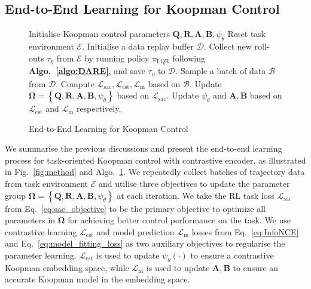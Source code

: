 \documentclass{article}
\begin{document}
\subsection{End-to-End Learning for Koopman Control}
\begin{figure}
    \begin{algorithm}[H]
        \caption{\small End-to-End Learning for Koopman Control}
        \label{algo:main}
        \small
    \begin{algorithmic}[1]
    \STATE Initialise Koopman control parameters $\mathbf{Q}, \mathbf{R}, \mathbf{A}, \mathbf{B}, \psi_{\theta} $
    \STATE Reset task environment $\mathcal{E}$.
    \STATE Initialise a data replay buffer $\mathcal{D}$.
        \STATE Collect new roll-outs $\tau_\eta$ from $\mathcal{E}$ by running policy $\pi_{\text{LQR}}$ following \textbf{Algo.~\ref{algo:DARE}}, and save $\tau_\eta$ to $\mathcal{D}$.
        \STATE Sample a batch of data  $\mathcal{B}$ from  $\mathcal{D}$.
        \STATE Compute $\mathcal{L}_{\text{sac}}, \mathcal{L}_{\text{cst}}, \mathcal{L}_{\text{m}}$ based on $\mathcal{B}$.
        \STATE Update $\boldsymbol{\Omega}=\left\{\mathbf{Q}, \mathbf{R}, \mathbf{A}, \mathbf{B}, \psi_{\theta} \right\}$ based on $\mathcal{L}_{\text{sac}}$.
        \STATE Update $\psi_{\theta}$ and $\mathbf{A}, \mathbf{B}$ based on $\mathcal{L}_{\text{cst}}$ and $\mathcal{L}_{\text{m}}$ respectively.
    \ENDFOR
    \end{algorithmic}
\end{algorithm}
\end{figure}
We summarise the previous discussions and present the end-to-end learning process for task-oriented Koopman control with contrastive encoder, as illustrated in Fig.~\ref{fig:method} and Algo.~\ref{algo:main}. We repeatedly collect batches of trajectory data from task environment $\mathcal{E}$ and utilise three objectives to update the parameter group $\boldsymbol{\Omega}=\left\{\mathbf{Q}, \mathbf{R}, \mathbf{A}, \mathbf{B}, \psi_{\theta} \right\}$ at each iteration. We take the RL task loss $\mathcal{L}_{\text{sac}}$ from Eq.~\eqref{eq:sac_objective} to be the primary objective to optimize all parameters in $\boldsymbol{\Omega}$ for achieving better control performance on the task. We use contrastive learning $\mathcal{L}_{\text{cst}}$ and model prediction $\mathcal{L}_\text{m}$ losses from Eq.~\eqref{eq:InfoNCE} and Eq.~\eqref{eq:model_fitting_loss} as two auxiliary objectives to regularise the parameter learning. $\mathcal{L}_{\text{cst}}$ is used to update $\psi_{\theta}(\cdot)$ to ensure a contrastive Koopman embedding space,  while $\mathcal{L}_\text{m}$ is used to update $\mathbf{A}, \mathbf{B}$ to ensure an accurate Koopman model in the embedding space. 
\end{document}
